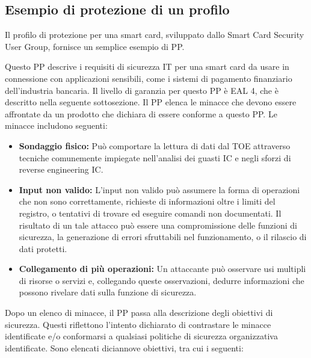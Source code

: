 \subsection{Esempio di protezione di un profilo}
Il profilo di protezione per una smart card, sviluppato dallo Smart Card Security User Group, fornisce un semplice esempio di PP.

\singlespacing

Questo PP descrive i requisiti di sicurezza IT per una smart card da usare in connessione con applicazioni sensibili, come i sistemi di pagamento finanziario dell'industria bancaria. Il livello di garanzia per questo PP è EAL 4, che è descritto nella seguente sottosezione. Il PP elenca le minacce che devono essere affrontate da un prodotto che dichiara di essere conforme a questo PP. Le minacce includono seguenti:
\begin{itemize}
    \item \textbf{Sondaggio fisico:} Può comportare la lettura di dati dal TOE attraverso tecniche comunemente impiegate nell'analisi dei guasti IC e negli sforzi di reverse engineering IC.
    
    \item \textbf{Input non valido:} L'input non valido può assumere la forma di operazioni che non sono correttamente, richieste di informazioni oltre i limiti del registro, o tentativi di trovare ed eseguire comandi non documentati. Il risultato di un tale attacco può essere una compromissione delle funzioni di sicurezza, la generazione di errori sfruttabili nel funzionamento, o il rilascio di dati protetti.
    
    \item \textbf{Collegamento di più operazioni:} Un attaccante può osservare usi multipli di risorse o servizi e, collegando queste osservazioni, dedurre informazioni che possono rivelare dati sulla funzione di sicurezza.


\end{itemize}
Dopo un elenco di minacce, il PP passa alla descrizione degli obiettivi di sicurezza. Questi riflettono l'intento dichiarato di contrastare le minacce identificate e/o conformarsi a qualsiasi politiche di sicurezza organizzativa identificate. Sono elencati diciannove obiettivi, tra cui i seguenti:
